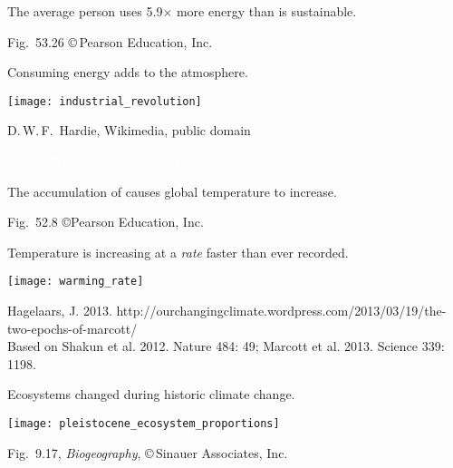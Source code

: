 \documentclass[t]{beamer}
\begin{document}
%
{
\begin{frame}[b]{The average person uses 5.9$\times$ more energy than is sustainable.}

	\hfill \tiny Fig.~53.26 \copyright\,Pearson Education, Inc.
\end{frame}
}
\begin{frame}[t]{Consuming energy adds  to the atmosphere.}

	\texttt{[image: industrial\_revolution]}

	\vfilll
	
	\hfill \tiny D.\,W.\,F.~Hardie, Wikimedia, public domain

\end{frame}
%
{
\begin{frame}[b]

	\hfill \tiny \textcolor{white}{\textsc{us epa}, Wikimedia Commons, public domain}
\end{frame}
}
%
{
\begin{frame}[b]{The accumulation of  causes global temperature to increase.}

	\hfill \tiny Fig.~52.8 \copyright Pearson Education, Inc.
\end{frame}
}
%
\begin{frame}[t]{Temperature is increasing at a \emph{rate} faster than ever recorded.}
	
	\vspace*{-0.5\baselineskip}
	
	{\centering\texttt{[image: warming\_rate]}\par%
	}
	
	\vfilll
	
	\tiny Hagelaars, J. 2013. http://ourchangingclimate.wordpress.com/2013/03/19/the-two-epochs-of-marcott/\\
Based on Shakun et al. 2012. Nature 484: 49; Marcott et al. 2013. Science 339: 1198. 

\end{frame}
%
\begin{frame}{Ecosystems changed during historic climate change.}

	\texttt{[image: pleistocene\_ecosystem\_proportions]}

	\vfilll
	
	\hfill \tiny Fig.~9.17, \emph{Biogeography}, \copyright\,Sinauer Associates, Inc.
\end{frame}
\end{document}
